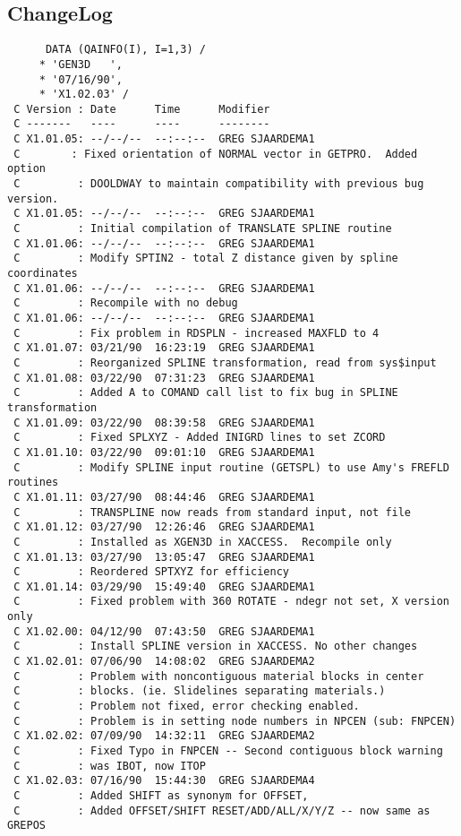\subsection{ChangeLog}
\begin{verbatim}
      DATA (QAINFO(I), I=1,3) /
     * 'GEN3D   ',
     * '07/16/90',
     * 'X1.02.03' /
 C Version : Date      Time      Modifier
 C -------   ----      ----      --------
 C X1.01.05: --/--/--  --:--:--  GREG SJAARDEMA1
 C        : Fixed orientation of NORMAL vector in GETPRO.  Added option
 C         : DOOLDWAY to maintain compatibility with previous bug version.
 C X1.01.05: --/--/--  --:--:--  GREG SJAARDEMA1
 C         : Initial compilation of TRANSLATE SPLINE routine
 C X1.01.06: --/--/--  --:--:--  GREG SJAARDEMA1
 C         : Modify SPTIN2 - total Z distance given by spline coordinates
 C X1.01.06: --/--/--  --:--:--  GREG SJAARDEMA1
 C         : Recompile with no debug
 C X1.01.06: --/--/--  --:--:--  GREG SJAARDEMA1
 C         : Fix problem in RDSPLN - increased MAXFLD to 4
 C X1.01.07: 03/21/90  16:23:19  GREG SJAARDEMA1
 C         : Reorganized SPLINE transformation, read from sys$input
 C X1.01.08: 03/22/90  07:31:23  GREG SJAARDEMA1
 C         : Added A to COMAND call list to fix bug in SPLINE transformation
 C X1.01.09: 03/22/90  08:39:58  GREG SJAARDEMA1
 C         : Fixed SPLXYZ - Added INIGRD lines to set ZCORD
 C X1.01.10: 03/22/90  09:01:10  GREG SJAARDEMA1
 C         : Modify SPLINE input routine (GETSPL) to use Amy's FREFLD routines
 C X1.01.11: 03/27/90  08:44:46  GREG SJAARDEMA1
 C         : TRANSPLINE now reads from standard input, not file
 C X1.01.12: 03/27/90  12:26:46  GREG SJAARDEMA1
 C         : Installed as XGEN3D in XACCESS.  Recompile only
 C X1.01.13: 03/27/90  13:05:47  GREG SJAARDEMA1
 C         : Reordered SPTXYZ for efficiency
 C X1.01.14: 03/29/90  15:49:40  GREG SJAARDEMA1
 C         : Fixed problem with 360 ROTATE - ndegr not set, X version only
 C X1.02.00: 04/12/90  07:43:50  GREG SJAARDEMA1
 C         : Install SPLINE version in XACCESS. No other changes
 C X1.02.01: 07/06/90  14:08:02  GREG SJAARDEMA2
 C         : Problem with noncontiguous material blocks in center
 C         : blocks. (ie. Slidelines separating materials.)
 C         : Problem not fixed, error checking enabled.
 C         : Problem is in setting node numbers in NPCEN (sub: FNPCEN)
 C X1.02.02: 07/09/90  14:32:11  GREG SJAARDEMA2
 C         : Fixed Typo in FNPCEN -- Second contiguous block warning
 C         : was IBOT, now ITOP
 C X1.02.03: 07/16/90  15:44:30  GREG SJAARDEMA4
 C         : Added SHIFT as synonym for OFFSET,
 C         : Added OFFSET/SHIFT RESET/ADD/ALL/X/Y/Z -- now same as GREPOS
\end{verbatim}

